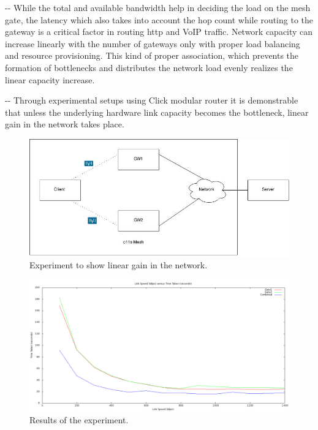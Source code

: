 \documentclass[12pt]{article}
\makeatletter
\newenvironment{indentation}[3]%
	{\par\setlength{\parindent}{#3}
	\setlength{\leftmargin}{#1}       \setlength{\rightmargin}{#1}%
	\advance\linewidth -\leftmargin       \advance\linewidth -\rightmargin%
	\advance\@totalleftmargin\leftmargin  \@setpar{{\@@par}}%
	\parshape 1\@totalleftmargin \linewidth\ignorespaces}{\par}%
\makeatother
\begin{document}
\begin{indentation}{0pt}{0pt}{0pt}
{\normalsize \hspace{1cm}While the total and available bandwidth help in deciding the load on the mesh gate, the latency which also takes into account the hop count while routing to the gateway is a critical factor in routing http and VoIP traffic. Network capacity can increase linearly with the number of gateways only with proper load balancing and resource provisioning. This kind of proper association, which prevents the formation of bottlenecks and distributes the network load evenly realizes the linear capacity increase.}
\end{indentation}


\begin{indentation}{0pt}{0pt}{0pt}
{\normalsize \hspace{1cm} Through experimental setups using Click modular router it is demonstrable that unless the underlying hardware link capacity becomes the bottleneck, linear gain in the network takes place.}
\end{indentation}

\begin{figure}[t]
  \centering
    \includegraphics[scale=0.50]{ExperimentLayout}
    \caption{Experiment to show linear gain in the network.}
    \label{Diagram: Experiment layout}
\end{figure}
\vspace*{1cm}
\begin{figure}[b]
    \centering
    \includegraphics[scale=0.35]{ExperimentGraph}
    \caption{Results of the experiment.}
    \label{Graph: Result}
\end{figure}
\end{document}
